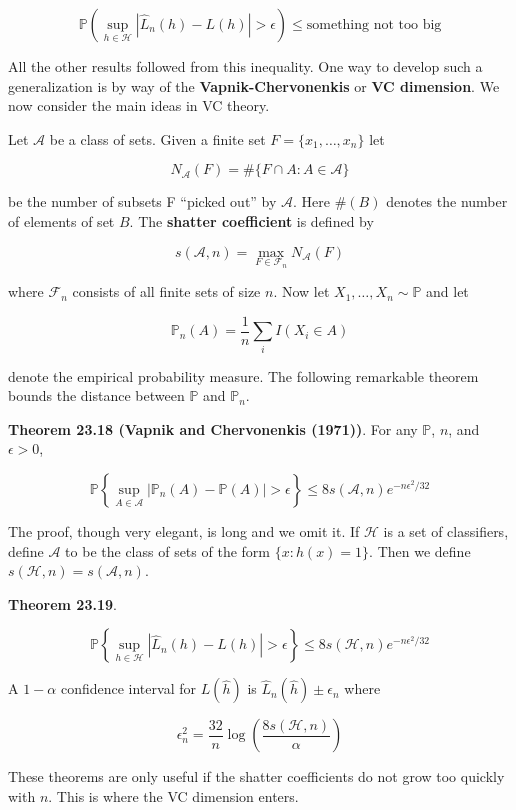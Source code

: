 \[ \mathbb{P} \left( \sup_{h \in \mathcal{H}} |\hat{L}_n(h) - L(h) | > \epsilon \right) \leq \text{something not too big} \]

All the other results followed from this inequality. One way to develop
such a generalization is by way of the \textbf{Vapnik-Chervonenkis} or
\textbf{VC dimension}. We now consider the main ideas in VC theory.

Let \(\mathcal{A}\) be a class of sets. Given a finite set
\(F = \{ x_1, \dots, x_n \}\) let

\[ N_\mathcal{A}(F) = \# \Big\{ F \cap A : A \in \mathcal{A} \Big\} \]

be the number of subsets F ``picked out'' by \(\mathcal{A}\). Here
\(\#(B)\) denotes the number of elements of set \(B\). The
\textbf{shatter coefficient} is defined by

\[ s(\mathcal{A}, n) = \max_{F \in \mathcal{F}_n} N_\mathcal{A}(F) \]

where \(\mathcal{F}_n\) consists of all finite sets of size \(n\). Now
let \(X_1, \dots, X_n \sim \mathbb{P}\) and let

\[ \mathbb{P}_n(A) = \frac{1}{n} \sum_i I(X_i \in A) \]

denote the empirical probability measure. The following remarkable
theorem bounds the distance between \(\mathbb{P}\) and \(\mathbb{P}_n\).

\textbf{Theorem 23.18 (Vapnik and Chervonenkis (1971))}. For any
\(\mathbb{P}\), \(n\), and \(\epsilon > 0\),

\[ \mathbb{P} \left\{ \sup_{A \in \mathcal{A}} | \mathbb{P}_n(A) - \mathbb{P}(A) | > \epsilon \right\} \leq 8 s(\mathcal{A}, n) e^{-n \epsilon^2 / 32} \]

The proof, though very elegant, is long and we omit it. If
\(\mathcal{H}\) is a set of classifiers, define \(\mathcal{A}\) to be
the class of sets of the form \(\{ x : h(x) = 1 \}\). Then we define
\(s(\mathcal{H}, n) = s(\mathcal{A}, n)\).

\textbf{Theorem 23.19}.

\[ \mathbb{P} \left\{ \sup_{h \in \mathcal{H}} | \hat{L}_n(h) - L(h) | > \epsilon \right\} \leq 8 s(\mathcal{H}, n) e^{-n \epsilon^2 / 32} \]

A \(1 - \alpha\) confidence interval for \(L(\hat{h})\) is
\(\hat{L}_n(\hat{h}) \pm \epsilon_n\) where

\[ \epsilon_n^2 = \frac{32}{n} \log \left( \frac{8 s(\mathcal{H}, n)}{\alpha} \right) \]

These theorems are only useful if the shatter coefficients do not grow
too quickly with \(n\). This is where the VC dimension enters.

